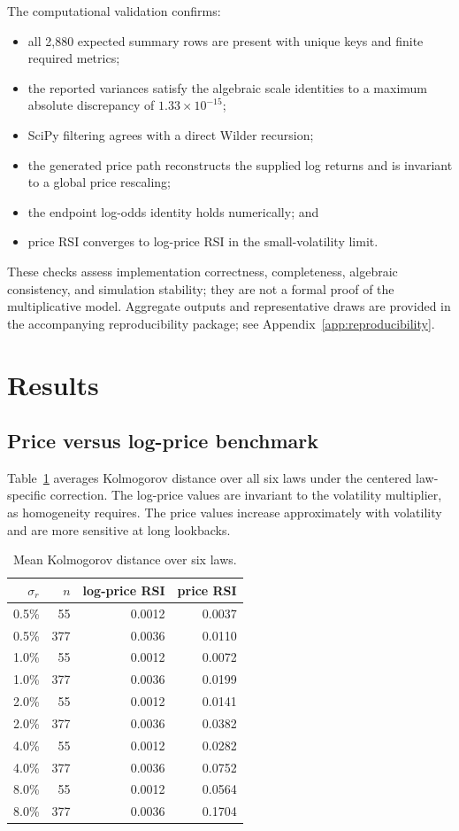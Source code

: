 \documentclass[10pt]{article}
\begin{document}
The computational validation confirms:
\begin{itemize}
\item all 2,880 expected summary rows are present with unique keys and finite
      required metrics;
\item the reported variances satisfy the algebraic scale identities to a
      maximum absolute discrepancy of $1.33\times10^{-15}$;
\item SciPy filtering agrees with a direct Wilder recursion;
\item the generated price path reconstructs the supplied log returns and is
      invariant to a global price rescaling;
\item the endpoint log-odds identity holds numerically; and
\item price RSI converges to log-price RSI in the small-volatility limit.
\end{itemize}
These checks assess implementation correctness, completeness, algebraic
consistency, and simulation stability; they are not a formal proof of the
multiplicative model.  Aggregate outputs and representative draws are provided
in the accompanying reproducibility package; see
Appendix~\ref{app:reproducibility}.

\section{Results}
\subsection{Price versus log-price benchmark}

Table~\ref{tab:mean-ks} averages Kolmogorov distance over all six laws under the centered law-specific correction. The log-price values are invariant to the volatility multiplier, as homogeneity requires. The price values increase approximately with volatility and are more sensitive at long lookbacks.

\begin{table}[ht]
\centering
\caption{Mean Kolmogorov distance over six laws.}\label{tab:mean-ks}
\begin{tabular}{rrrr}
\toprule
$\sigma_r$ & $n$ & log-price RSI & price RSI\\
\midrule
0.5\% & 55 & 0.0012 & 0.0037\\
0.5\% & 377 & 0.0036 & 0.0110\\
1.0\% & 55 & 0.0012 & 0.0072\\
1.0\% & 377 & 0.0036 & 0.0199\\
2.0\% & 55 & 0.0012 & 0.0141\\
2.0\% & 377 & 0.0036 & 0.0382\\
4.0\% & 55 & 0.0012 & 0.0282\\
4.0\% & 377 & 0.0036 & 0.0752\\
8.0\% & 55 & 0.0012 & 0.0564\\
8.0\% & 377 & 0.0036 & 0.1704\\
\bottomrule
\end{tabular}
\end{table}
\end{document}
